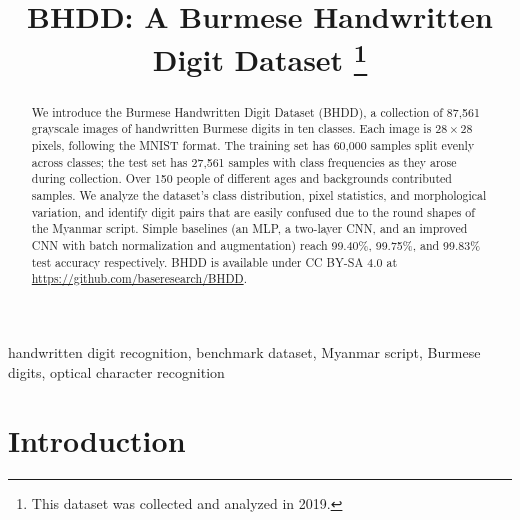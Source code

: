 \documentclass[conference]{IEEEtran}
\begin{document}
\title{BHDD: A Burmese Handwritten Digit Dataset
\thanks{This dataset was collected and analyzed in 2019.}
}

\author{
  \and
  \and
  \and
}

\maketitle

\begin{abstract}
We introduce the Burmese Handwritten Digit Dataset (BHDD), a collection
of 87,561 grayscale images of handwritten Burmese digits in ten classes.
Each image is $28\times28$ pixels, following the MNIST format. The
training set has 60,000 samples split evenly across classes; the test
set has 27,561 samples with class frequencies as they arose during
collection. Over 150 people
of different ages and backgrounds contributed samples. We analyze the
dataset's class distribution, pixel statistics, and morphological
variation, and identify digit pairs that are easily confused due to the
round shapes of the Myanmar script. Simple baselines (an MLP, a two-layer CNN, and an improved
CNN with batch normalization and augmentation) reach 99.40\%,
99.75\%, and 99.83\% test accuracy respectively.
BHDD is available under CC BY-SA 4.0 at
\url{https://github.com/baseresearch/BHDD}.
\end{abstract}

\begin{IEEEkeywords}
handwritten digit recognition, benchmark dataset, Myanmar script,
Burmese digits, optical character recognition
\end{IEEEkeywords}

\section{Introduction}
\end{document}
